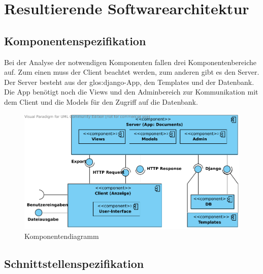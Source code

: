 \chapter{Resultierende Softwarearchitektur}

\section{Komponentenspezifikation}

Bei der Analyse der notwendigen Komponenten fallen drei Komponentenbereiche auf.
Zum einen muss der Client beachtet werden, zum anderen gibt es den Server. Der
Server besteht aus der \gls{glos:django}-App, den Templates und der Datenbank. Die App
benötigt noch die Views und den Adminbereich zur Kommunikation mit dem Client
und die Models für den Zugriff auf die Datenbank.

\begin{figure}[H]
    \begin{center}
\includegraphics[width=0.8\linewidth]{bilder/Komponentendiagramm.pdf}
\caption[Komponentendiagramm]{Komponentendiagramm}
\label{Komponentendiagramm}
    \end{center}
\end{figure}

\section{Schnittstellenspezifikation}

